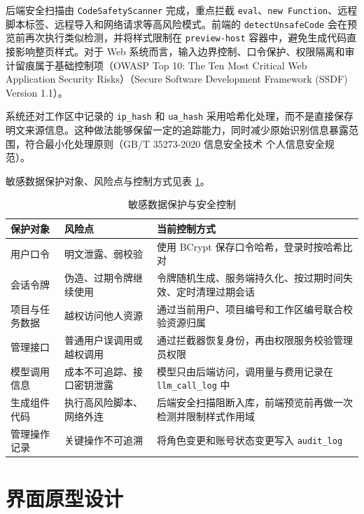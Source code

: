 后端安全扫描由 \texttt{CodeSafetyScanner} 完成，重点拦截 \texttt{eval}、\texttt{new Function}、远程脚本标签、远程导入和网络请求等高风险模式。前端的 \texttt{detectUnsafeCode} 会在预览前再次执行类似检测，并将样式限制在 \texttt{preview-host} 容器中，避免生成代码直接影响整页样式。对于 Web 系统而言，输入边界控制、口令保护、权限隔离和审计留痕属于基础控制项（OWASP Top 10: The Ten Most Critical Web Application Security Risks）（Secure Software Development Framework (SSDF) Version 1.1）\cite{owasp2021top10}\cite{nistssdf2024}。

系统还对工作区中记录的 \texttt{ip\_hash} 和 \texttt{ua\_hash} 采用哈希化处理，而不是直接保存明文来源信息。这种做法能够保留一定的追踪能力，同时减少原始识别信息暴露范围，符合最小化处理原则（GB/T 35273-2020 信息安全技术 个人信息安全规范）\cite{gbt35273_2020}。

敏感数据保护对象、风险点与控制方式见表 \ref{tab:chapter4-security-design}。

\begin{table}[!htbp]
\centering
\caption{敏感数据保护与安全控制}
\label{tab:chapter4-security-design}
\small
\begin{tabular}{@{}p{}p{}p{}@{}}
\toprule
保护对象 & 风险点 & 当前控制方式 \\
\midrule
用户口令 & 明文泄露、弱校验 & 使用 BCrypt 保存口令哈希，登录时按哈希比对 \\
会话令牌 & 伪造、过期令牌继续使用 & 令牌随机生成、服务端持久化、按过期时间失效、定时清理过期会话 \\
项目与任务数据 & 越权访问他人资源 & 通过当前用户、项目编号和工作区编号联合校验资源归属 \\
管理接口 & 普通用户误调用或越权调用 & 通过拦截器恢复身份，再由权限服务校验管理员权限 \\
模型调用信息 & 成本不可追踪、接口密钥泄露 & 模型只由后端访问，调用量与费用记录在 \texttt{llm\_call\_log} 中 \\
生成组件代码 & 执行高风险脚本、网络外连 & 后端安全扫描阻断入库，前端预览前再做一次检测并限制样式作用域 \\
管理操作记录 & 关键操作不可追溯 & 将角色变更和账号状态变更写入 \texttt{audit\_log} \\
\bottomrule
\end{tabular}
\end{table}

\section{界面原型设计}
